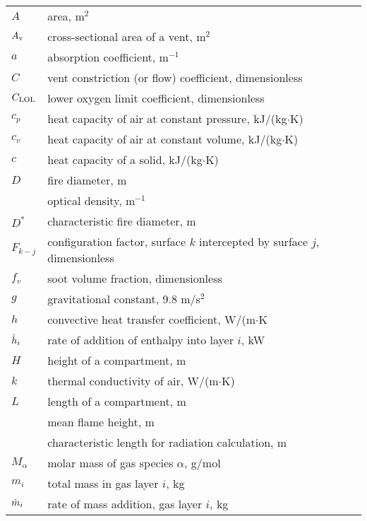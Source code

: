 \documentclass[12pt]{book}
\begin{document}
\begin{center}
\begin{longtable}{p{1in}  p{5.5 in}}

$A$                 & area, m$^2$ \\
$A_{\rm v}$         & cross-sectional area of a vent, m$^2$ \\
$a$                 & absorption coefficient, m$^{-1}$ \\
$C$                 & vent constriction (or flow) coefficient, dimensionless \\
$C_{\rm LOL}$       & lower oxygen limit coefficient, dimensionless \\
$c_p$               & heat capacity of air at constant pressure, kJ/(kg$\cdot$K) \\
$c_v$               & heat capacity of air at constant volume, kJ/(kg$\cdot$K) \\
$c$                 & heat capacity of a solid, kJ/(kg$\cdot$K) \\
$D$                 & fire diameter, m \\
                    & optical density, m$^{-1}$ \\
$D^*$               & characteristic fire diameter, m \\
$F_{k-j}$           & configuration factor, surface $k$ intercepted by surface $j$, dimensionless \\
$f_v$               & soot volume fraction, dimensionless \\
$g$                 & gravitational constant, 9.8 m/s$^2$ \\
$h$                 & convective heat transfer coefficient, W/(m$\cdot$K \\
$\dot{h}_i$            & rate of addition of enthalpy into layer $i$, kW \\
$H$                 & height of a compartment, m \\
$k$                 & thermal conductivity of air, W/(m$\cdot$K) \\
$L$                 & length of a compartment, m \\
                    & mean flame height, m \\
                    & characteristic length for radiation calculation, m \\
$M_\alpha$          & molar mass of gas species $\alpha$, g/mol \\
$m_i$               & total mass in gas layer $i$, kg \\
$\dot{m}_i$             & rate of mass addition, gas layer $i$, kg \\

\end{longtable}
\end{center}
\end{document}
